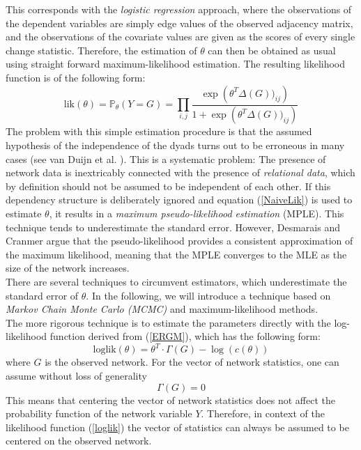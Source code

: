 \documentclass[10pt, conference, compsocconf]{IEEEtran}
\begin{document}
This corresponds with the \textit{logistic regression} approach, where the observations of the dependent variables are simply edge values of the observed adjacency matrix, and the observations of the covariate values are given as the scores of every single change statistic. Therefore, the estimation of $\theta$ can then be obtained as usual using straight forward maximum-likelihood estimation. The resulting likelihood function is of the following form:
\begin{equation}
\text{lik}(\theta)= \mathbb{P}_{\theta}(Y=G)= \prod_{i,j} \dfrac{ \exp \left(\theta^T \Delta(G))_{ij} \right)}{1+\exp \left(\theta^T \Delta(G))_{ij} \right)}
\label{NaiveLik}
\end{equation}
The problem with this simple estimation procedure is that the assumed hypothesis of the independence of the dyads turns out to be erroneous in many cases (see van Duijn et al. \cite{vanDuijnetal2009}). This is a systematic problem: The presence of network data is inextricably connected with the presence of \textit{relational data}, which by definition should not be assumed to be independent of each other. If this dependency structure is deliberately ignored and equation (\ref{NaiveLik}) is used to estimate $\theta$, it results in a \textit{maximum pseudo-likelihood estimation} (MPLE). This technique tends to underestimate the standard error. However, Desmarais and Cranmer \cite{Desmarais.2012} argue that the pseudo-likelihood provides a consistent approximation of the maximum likelihood, meaning that the MPLE converges to the MLE as the size of the network increases.\\[0.3cm]
There are several techniques to circumvent estimators, which underestimate the standard error of $\theta$. In the following, we will introduce a technique based on \textit{Markov Chain Monte Carlo (MCMC)} and maximum-likelihood methods.\\[0.3cm]
The more rigorous technique is to estimate the parameters directly with the log-likelihood function derived from (\ref{ERGM}), which has the following form:
%
\begin{equation}
\text{loglik}(\theta)=\theta^T \cdot \Gamma(G)-\log(c(\theta))
\label{loglik}
\end{equation}
%
where $G$ is the observed network. For the vector of network statistics, one can assume without loss of generality
%
\begin{equation}
\Gamma(G)=0 \label{assumption}
\end{equation}
%
This means that centering the vector of network statistics does not affect the probability function of the network variable $Y$. Therefore, in context of the likelihood function (\ref{loglik}) the vector of statistics can always be assumed to be centered on the observed network.\\
\end{document}
